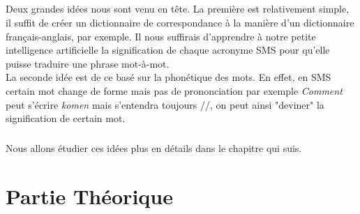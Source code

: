\documentclass[11pt]{report}
\begin{document}
	\paragraph{}
	Deux grandes idées nous sont venu en tête. La première est relativement simple, il suffit de créer un dictionnaire de correspondance à la manière d'un dictionnaire français-anglais, par exemple. Il nous suffirais d'apprendre à notre petite intelligence artificielle la signification de chaque acronyme SMS pour qu'elle puisse traduire une phrase mot-à-mot.\\
	La seconde idée est de ce basé sur la phonétique des mots. En effet, en SMS certain mot change de forme mais pas de prononciation par exemple {\em Comment} peut s'écrire {\em komen} mais s'entendra toujours //, on peut ainsi "deviner" la signification de certain mot.
	\paragraph{}
	Nous allons étudier ces idées plus en détails dans le chapitre qui suis.

\chapter{Partie Théorique}
\end{document}
